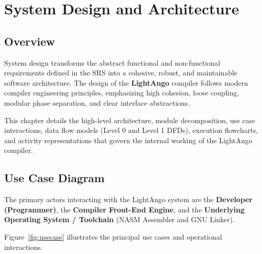 \chapter{System Design and Architecture}\doublespacing

\section{Overview}
System design transforms the abstract functional and non-functional requirements defined in the SRS into a cohesive, robust, and maintainable software architecture. The design of the \textbf{LightAngo} compiler follows modern compiler engineering principles, emphasizing high cohesion, loose coupling, modular phase separation, and clear interface abstractions.

This chapter details the high-level architecture, module decomposition, use case interactions, data flow models (Level 0 and Level 1 DFDs), execution flowcharts, and activity representations that govern the internal working of the LightAngo compiler.

\section{Use Case Diagram}
The primary actors interacting with the LightAngo system are the \textbf{Developer (Programmer)}, the \textbf{Compiler Front-End Engine}, and the \textbf{Underlying Operating System / Toolchain} (NASM Assembler and GNU Linker).

Figure~\ref{fig:usecase} illustrates the principal use cases and operational interactions.

